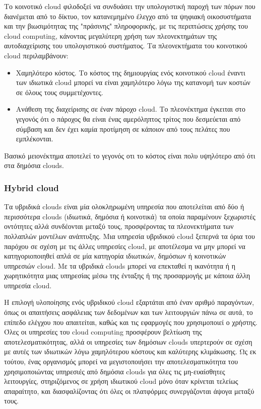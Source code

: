 	Το κοινοτικό cloud φιλοδοξεί να συνδυάσει την υπολογιστική παροχή των πόρων που διανέμεται από το δίκτυο, τον κατανεμημένο έλεγχο από τα ψηφιακή οικοσυστήματα και την βιωσιμότητας της "πράσινης" πληροφορικής, με τις περιπτώσεις χρήσης του cloud computing, κάνοντας μεγαλύτερη χρήση των πλεονεκτημάτων της αυτοδιαχείρισης του υπολογιστικού συστήματος. Τα πλεονεκτήματα του κοινοτικού cloud περιλαμβάνουν:
	\begin{itemize}
	
	\item Χαμηλότερο κόστος. Το κόστος της δημιουργίας ενός κοινοτικού cloud έναντι των ιδιωτικά cloud μπορεί να είναι χαμηλότερο λόγω της κατανομή των κοστών σε όλους τους συμμετέχοντες.

	\item Ανάθεση της διαχείρισης σε έναν πάροχο cloud. Το πλεονέκτημα έγκειται στο γεγονός ότι ο πάροχος θα είναι ένας αμερόληπτος τρίτος που δεσμεύεται από σύμβαση και δεν έχει καμία προτίμηση σε κάποιον από τους πελάτες που εμπλέκονται.
	
	\end{itemize}

Βασικό μειονέκτημα αποτελεί το γεγονός οτι το κόστος είναι πολυ υψηλότερο από ότι στα δημόσια clouds. \cite{cloudOverview}

		
		
		
		\subsubsection{Hybrid cloud}
		
		Τα υβριδικά clouds είναι μία ολοκληρωμένη υπηρεσία που αποτελείται από δύο ή περισσότερα clouds (ιδιωτικά, δημόσια ή κοινοτικά) τα οποία παραμένουν ξεχωριστές οντότητες αλλά συνδέονται μεταξύ τους, προσφέροντας τα πλεονεκτήματα των πολλαπλών μοντέλων ανάπτυξης. Μια υπηρεσία υβριδικού cloud ξεπερνά τα όρια του παρόχου σε σχέση με τις άλλες υπηρεσίες cloud,  με αποτέλεσμα να μην μπορεί να κατηγοριοποιηθεί  απλά σε μία κατηγορία ιδιωτικών, δημόσιων ή κοινοτικών υπηρεσιών cloud. Με τα υβριδικά clouds μπορεί να επεκταθεί η ικανότητα ή η χωρητικότητα μιας υπηρεσίας μέσω της ένταξης ή της προσαρμογής με κάποια άλλη υπηρεσία cloud. \cite{palwe}
		
		Η επιλογή υλοποίησης ενός υβριδικού cloud εξαρτάται από έναν αριθμό παραγόντων, όπως οι απαιτήσεις ασφάλειας των δεδομένων και των λειτουργιών πάνω σε αυτά, το επίπεδο ελέγχου που απαιτείται, καθώς και τις εφαρμογές που χρησιμοποιεί ο χρήστης. Όλες οι υπηρεσίες του cloud computing προσφέρουν βελτίωση της αποτελεσματικότητας, αλλά οι υπηρεσίες των δημόσιων clouds υπερτερούν σε σχέση με αυτές των ιδιωτικών λόγω χαμηλότερου κόστους και καλύτερης κλιμάκωσης. Ως εκ τούτου, ένας οργανισμός μπορεί να μεγιστοποιήσει την αποτελεσματικότητα του χρησιμοποιώντας υπηρεσιές από δημόσια clouds για όλες τις μη-ευαίσθητες λειτουργίες, στηριζόμενος σε χρήση ιδιωτικού cloud μόνο όταν κρίνεται τελείως απαραίτητο, και διασφαλίζοντας ότι όλες οι πλατφόρμες συνεργάζονται άψογα μεταξύ τους. \cite{Zhou2013}
		
